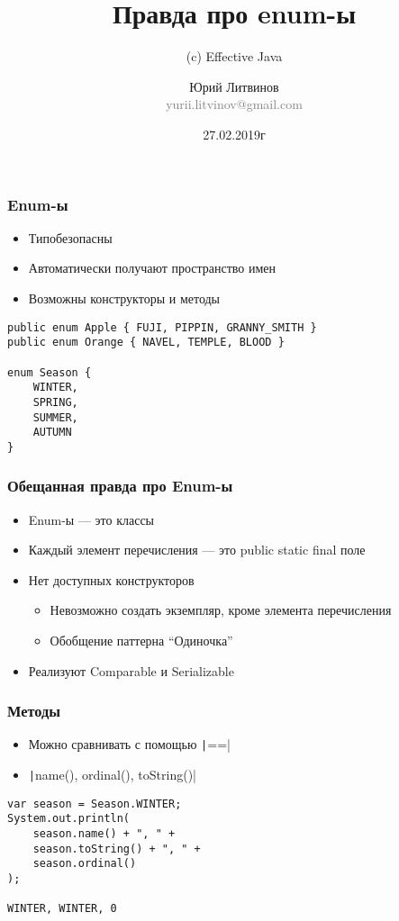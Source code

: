 \documentclass[xetex,mathserif,serif]{beamer}
\title{Правда про enum-ы}
\subtitle{(c) Effective Java}
\author[Юрий Литвинов]{Юрий Литвинов\\\small{\textcolor{gray}{yurii.litvinov@gmail.com}}}
\date{27.02.2019г}
\begin{document}
	\frame{\titlepage}

	\begin{frame}[fragile]
		\frametitle{Enum-ы}
		\begin{itemize}
			\item Типобезопасны
			\item Автоматически получают пространство имен
			\item Возможны конструкторы и методы
		\end{itemize}
		\begin{verbatim}
public enum Apple { FUJI, PIPPIN, GRANNY_SMITH }
public enum Orange { NAVEL, TEMPLE, BLOOD }

enum Season {
    WINTER, 
    SPRING,
    SUMMER, 
    AUTUMN
}
		\end{verbatim}
	\end{frame}

	\begin{frame}
		\frametitle{Обещанная правда про Enum-ы}
		\begin{itemize}
			\item Enum-ы --- это классы
			\item Каждый элемент перечисления --- это public static final поле
			\item Нет доступных конструкторов
			\begin{itemize}
				\item Невозможно создать экземпляр, кроме элемента перечисления
				\item Обобщение паттерна ``Одиночка''
			\end{itemize}
			\item Реализуют Comparable и Serializable
		\end{itemize}
	\end{frame}

	\begin{frame}[fragile]
		\frametitle{Методы}
		\begin{itemize}
			\item Можно сравнивать с помощью \texttt|==|
			\item \texttt|name(), ordinal(), toString()|
		\end{itemize}
		\begin{verbatim}
var season = Season.WINTER; 
System.out.println(
    season.name() + ", " +
    season.toString() + ", " +
    season.ordinal()
);

WINTER, WINTER, 0
		\end{verbatim}
	\end{frame}
\end{document}
